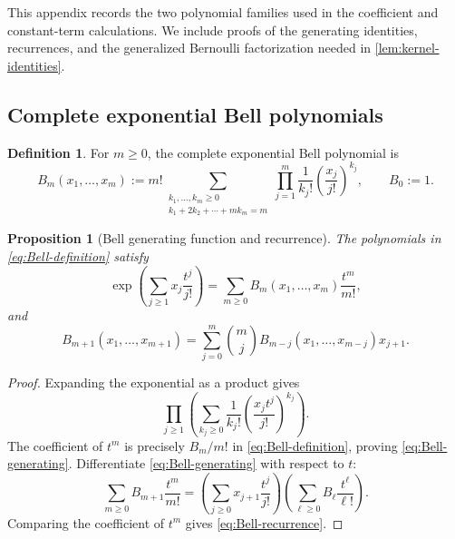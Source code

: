 \documentclass[11pt,a4paper]{amsart}
\numberwithin{equation}{section}
\newtheorem{proposition}[theorem]{Proposition}
\theoremstyle{definition}
\newtheorem{definition}[theorem]{Definition}
\theoremstyle{remark}
\begin{document}
This appendix records the two polynomial families used in the coefficient
and constant-term calculations.  We include proofs of the generating
identities, recurrences, and the generalized Bernoulli factorization
needed in \cref{lem:kernel-identities}.

\subsection{Complete exponential Bell polynomials}
\label{app:bell}

\begin{definition}
For $m\geq0$, the complete exponential Bell polynomial is
\begin{equation}
 B_m(x_1,\ldots,x_m)
 :=m!\!\!\sum_{\substack{k_1,\ldots,k_m\geq0\\
 k_1+2k_2+\cdots+mk_m=m}}
 \prod_{j=1}^m\frac1{k_j!}
 \left(\frac{x_j}{j!}\right)^{k_j},
 \qquad B_0:=1.
 \label{eq:Bell-definition}
\end{equation}
\end{definition}

\begin{proposition}[Bell generating function and recurrence]
\label{prop:Bell-properties}
The polynomials in \eqref{eq:Bell-definition} satisfy
\begin{equation}
 \exp\!\left(\sum_{j\geq1}x_j\frac{t^j}{j!}\right)
 =\sum_{m\geq0}B_m(x_1,\ldots,x_m)\frac{t^m}{m!},
 \label{eq:Bell-generating}
\end{equation}
and
\begin{equation}
 B_{m+1}(x_1,\ldots,x_{m+1})
 =\sum_{j=0}^m\binom mj
 B_{m-j}(x_1,\ldots,x_{m-j})x_{j+1}.
 \label{eq:Bell-recurrence}
\end{equation}
\end{proposition}

\begin{proof}
Expanding the exponential as a product gives
\begin{equation*}
 \prod_{j\geq1}
 \left(\sum_{k_j\geq0}\frac1{k_j!}
 \left(\frac{x_jt^j}{j!}\right)^{k_j}\right).
\end{equation*}
The coefficient of $t^m$ is precisely
$B_m/m!$ in \eqref{eq:Bell-definition}, proving
\eqref{eq:Bell-generating}.  Differentiate
\eqref{eq:Bell-generating} with respect to $t$:
\begin{equation*}
 \sum_{m\geq0}B_{m+1}\frac{t^m}{m!}
 =\left(\sum_{j\geq0}x_{j+1}\frac{t^j}{j!}\right)
 \left(\sum_{\ell\geq0}B_\ell\frac{t^\ell}{\ell!}\right).
\end{equation*}
Comparing the coefficient of $t^m$ gives
\eqref{eq:Bell-recurrence}.
\end{proof}
\end{document}
